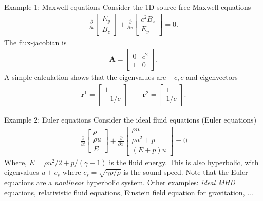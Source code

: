 \documentclass[pdf]{beamer}
\newcommand{\mvec}[1]{\mathbf{#1}}
\theoremstyle{definition}
\begin{document}
\begin{frame}{Example 1: Maxwell equations}
  \small
  Consider the 1D source-free Maxwell equations
  \begin{align*}
    \frac{\partial }{\partial t}
    \left[
    \begin{matrix}
      E_y \\
      B_z
    \end{matrix}
    \right]
    +
    \frac{\partial }{\partial x}
    \left[
    \begin{matrix}
      c^2B_z \\
      E_y
    \end{matrix}
    \right]
    =
    0.
  \end{align*}
  The flux-jacobian is
  \begin{align*}
    \mvec{A} =
    \left[
    \begin{matrix}
      0 & c^2 \\
      1 & 0
    \end{matrix}
    \right]. 
  \end{align*}
  A simple calculation shows that the eigenvalues are $-c,c$ and
  eigenvectors
  \begin{align*}
    \mvec{r}^1 =
    \left[
    \begin{matrix}
      1 \\
      -1/c
    \end{matrix}
    \right]
    \qquad
    \mvec{r}^2 =
    \left[
    \begin{matrix}
      1 \\
      1/c
    \end{matrix}
    \right].
  \end{align*}
\end{frame}

\begin{frame}{Example 2: Euler equations}
  \small Consider the ideal fluid equations (Euler equations)
  \begin{align*}
  \frac{\partial}{\partial{t}}
  \left[
    \begin{matrix}
      \rho \\
      \rho u \\
      E
    \end{matrix}
  \right]
  +
  \frac{\partial}{\partial{x}}
  \left[
    \begin{matrix}
      \rho u \\
      \rho u^2 + p \\
      (E+p)u
    \end{matrix}
  \right]
  =
  0
  \end{align*}
  Where, $E = \rho u^2/2 + p/(\gamma-1)$ is the fluid energy. This is
  also hyperbolic, with eigenvalues $u \pm c_s$ where
  $c_s = \sqrt{\gamma p/\rho}$ is the sound speed.%
  \vskip0.1in%
  Note that the Euler equations are a \emph{nonlinear} hyperbolic
  system. Other examples: \emph{ideal MHD} equations, relativistic
  fluid equations, Einstein field equation for gravitation, ...
\end{frame}
\end{document}
